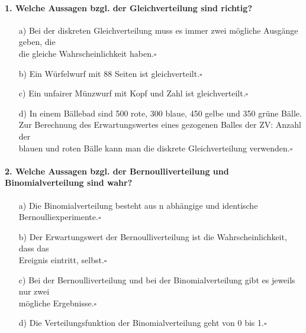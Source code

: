 \documentclass[a4paper]{article}
\begin{document}
\paragraph{1. Welche Aussagen bzgl. der Gleichverteilung sind richtig? }
\begin{itemize}
    \item[a)]Bei der diskreten Gleichverteilung muss es immer zwei mögliche Ausgänge geben, die\\ die gleiche Wahrscheinlichkeit haben.\hfill $\square$
    \item[b)]Ein Würfelwurf mit 88 Seiten ist gleichverteilt.\hfill $\square$
    \item[c)]Ein unfairer Münzwurf mit Kopf und Zahl ist gleichverteilt.\hfill $\square$
    \item[d)]In einem Bällebad sind 500 rote, 300 blaue, 450 gelbe und 350 grüne Bälle. \\Zur Berechnung des Erwartungswertes eines gezogenen Balles der ZV: Anzahl der\\ blauen und roten Bälle kann man die diskrete Gleichverteilung verwenden.\hfill $\square$
\end{itemize}

\paragraph{2. Welche Aussagen bzgl. der Bernoulliverteilung und Binomialverteilung sind wahr?}
\begin{itemize}
    \item[a)]Die Binomialverteilung besteht aus n abhängige und identische Bernoulliexperimente.\hfill $\square$
    \item[b)]Der Erwartungswert der Bernoulliverteilung ist die Wahrscheinlichkeit, dass das\\ Ereignis eintritt, selbst.\hfill $\square$
    \item[c)]Bei der Bernoulliverteilung und bei der Binomialverteilung gibt es jeweils nur zwei\\ mögliche Ergebnisse.\hfill $\square$
    \item[d)]Die Verteilungsfunktion der Binomialverteilung geht von 0 bis 1.\hfill $\square$
\end{itemize}
\end{document}
